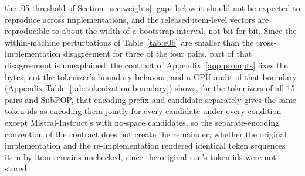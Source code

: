 \documentclass[11pt]{article}
\begin{document}
the .05 threshold of Section~\ref{sec:weights}: gaps below it should not be
expected to reproduce across implementations, and the released item-level
vectors are reproducible to about the width of a bootstrap interval, not bit
for bit. Since the within-machine perturbations of Table~\ref{tab:e0b} are smaller than the cross-implementation disagreement for three of the four pairs, part of that disagreement is unexplained; the contract of Appendix~\ref{app:prompts} fixes the bytes, not the tokenizer's boundary behavior, and a CPU audit of that boundary (Appendix Table~\ref{tab:tokenization-boundary}) shows, for the tokenizers of all 15 pairs and SubPOP, that encoding prefix and candidate separately gives the same token ids as encoding them jointly for every candidate under every condition except Mistral-Instruct's with no-space candidates, so the separate-encoding convention of the contract does not create the remainder; whether the original implementation and the re-implementation rendered identical token sequences item by item remains unchecked, since the original run's token ids were not stored.

\FloatBarrier

\end{document}
